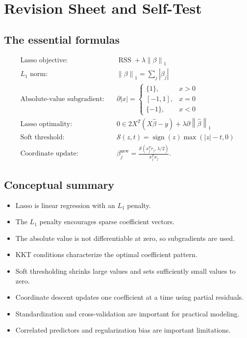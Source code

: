 \documentclass[11pt,a4paper]{article}
\numberwithin{equation}{section}
\newcommand{\norm}[1]{\left\lVert #1\right\rVert}
\newcommand{\abs}[1]{\left|#1\right|}
\newcommand{\soft}{\mathcal{S}}
\newcommand{\sign}{\operatorname{sign}}
\newcommand{\RSS}{\operatorname{RSS}}
\begin{document}
\section{Revision Sheet and Self-Test}
\subsection{The essential formulas}
\begin{align*}
  \text{Lasso objective:}\quad&\RSS+\lambda\norm{\beta}_1\\
  \text{$L_1$ norm:}\quad&\norm{\beta}_1=\sum_j\abs{\beta_j}\\
  \text{Absolute-value subgradient:}\quad&\partial\abs{x}=\begin{cases}\{1\},&x>0\\[-2pt][-1,1],&x=0\\[-2pt]\{-1\},&x<0\end{cases}\\
  \text{Lasso optimality:}\quad&0\in2X^T(X\hat\beta-y)+\lambda\partial\norm{\hat\beta}_1\\
  \text{Soft threshold:}\quad&\soft(z,t)=\sign(z)\max(\abs{z}-t,0)\\
  \text{Coordinate update:}\quad&\beta_j^{\mathrm{new}}=\frac{\soft(x_j^Tr_j,\lambda/2)}{x_j^Tx_j}.
\end{align*}

\subsection{Conceptual summary}
\begin{itemize}
  \item Lasso is linear regression with an $L_1$ penalty.
  \item The $L_1$ penalty encourages sparse coefficient vectors.
  \item The absolute value is not differentiable at zero, so subgradients are used.
  \item KKT conditions characterize the optimal coefficient pattern.
  \item Soft thresholding shrinks large values and sets sufficiently small values to zero.
  \item Coordinate descent updates one coefficient at a time using partial residuals.
  \item Standardization and cross-validation are important for practical modeling.
  \item Correlated predictors and regularization bias are important limitations.
\end{itemize}
\end{document}
